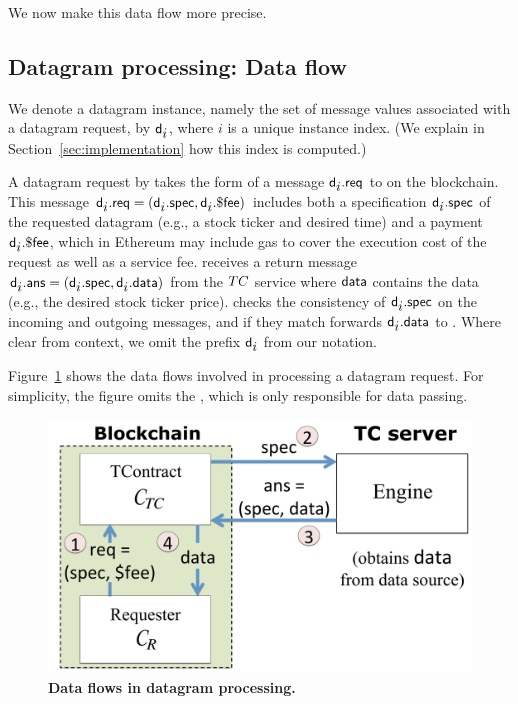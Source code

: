 
We now make this data flow more precise. 

\subsection{Datagram processing: Data flow}

We denote a datagram instance, namely the set of message values associated with a datagram request, by ${\sf d_{\mbox{$i$}}}$, where $i$ is a unique instance index. (We explain in Section~\ref{sec:implementation} how this index is computed.) 

A datagram request by \reqcont takes the form of a message ${\sf d_{\mbox{$i$}}}.{\sf req}$ to \tcont on the blockchain. This message ${\sf d_{\mbox{$i$}}}.{\sf req} = ({\sf d_{\mbox{$i$}}}.{\sf spec}, {\sf d_{\mbox{$i$}}}.{\sf \$fee})$ includes both a specification ${\sf d_{\mbox{$i$}}}.{\sf spec}$ of the requested datagram (e.g., a stock ticker and desired time) and a payment ${\sf d_{\mbox{$i$}}}.{\sf \$fee}$, which in Ethereum may include gas to cover the execution cost of the request as well as a service fee. \tcont receives a return message ${\sf d_{\mbox{$i$}}}.{\sf ans} = ({\sf d_{\mbox{$i$}}}.{\sf spec}, {\sf d_{\mbox{$i$}}}.{\sf data})$ from the $TC$ service where ${\sf data}$ contains the data (e.g., the desired stock ticker price). \tcont checks the consistency of ${\sf d_{\mbox{$i$}}}.{\sf spec}$ on the incoming and outgoing messages, and if they match forwards ${\sf d_{\mbox{$i$}}}.{\sf data}$ to \reqcont. Where clear from context, we omit the prefix ${\sf d_{\mbox{$i$}}}$ from our notation.

Figure~\ref{fig:dataflow} shows the data flows involved in processing a datagram request. For simplicity, the figure omits the \medname, which is only responsible for data passing.


\begin{figure}[h!]
\centering
\includegraphics[width=\columnwidth]{figures/DataflowFig}
\caption{{\bf Data flows in datagram processing.}}
\label{fig:dataflow}
\end{figure}


